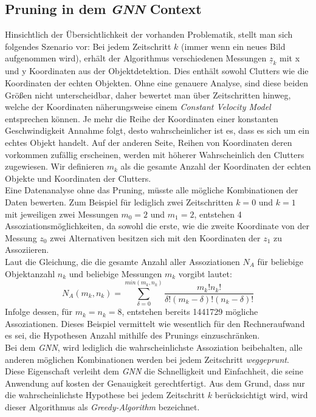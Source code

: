 \documentclass[10pt,a4paper]{article}
\begin{document}
\subsection{Pruning in dem \textit{GNN} Context}
Hinsichtlich der Übersichtlichkeit der vorhanden Problematik, stellt man sich folgendes Szenario vor: Bei jedem Zeitschritt $k$ (immer wenn ein neues Bild aufgenommen wird), erhält der Algorithmus verschiedenen Messungen $\underline{z}_k$ mit x und y Koordinaten aus der Objektdetektion. Dies enthält sowohl Clutters wie die Koordinaten der echten Objekten. Ohne eine genauere Analyse, sind diese beiden Größen nicht unterscheidbar, daher bewertet man über Zeitschritten hinweg, welche der Koordinaten näherungsweise einem \textit{Constant Velocity Model} entsprechen können. Je mehr die Reihe der Koordinaten einer konstanten Geschwindigkeit Annahme folgt, desto wahrscheinlicher ist es, dass es sich um ein echtes Objekt handelt. Auf der anderen Seite, Reihen von 
Koordinaten deren vorkommen zufällig erscheinen, werden mit höherer Wahrscheinlich den Clutters zugewiesen. Wir definieren $m_k$ als die gesamte Anzahl der Koordinaten der echten Objekte und Koordinaten der Clutters.\\
Eine Datenanalyse ohne das Pruning, müsste alle mögliche Kombinationen der Daten bewerten. Zum Beispiel für lediglich zwei Zeitschritten $k =0$ und $k=1$ mit jeweiligen zwei Messungen  $m_0 = 2$ und $m_1 = 2$, entstehen 4 Assoziationsmöglichkeiten, da sowohl die erste, wie die zweite Koordinate von der Messung $z_0$ zwei Alternativen besitzen sich mit den Koordinaten der $z_1$ zu Assoziieren.\\
Laut \cite{MOTyoutube} die Gleichung, die die gesamte Anzahl aller Assoziationen $N_A$ für beliebige Objektanzahl $n_k$ und beliebige Messungen $m_k$ vorgibt lautet:
\begin{equation}
N_A(m_k,n_k) = \sum_{\delta=0}^{min(m_k,n_k)}\dfrac{m_k!n_k!}{\delta!(m_k-\delta)!(n_k-\delta)!}
\end{equation}
Infolge dessen, für $m_k=n_k = 8$, entstehen bereits 1441729 mögliche Assoziationen. Dieses Beispiel vermittelt wie wesentlich für den Rechneraufwand es sei, die Hypothesen Anzahl mithilfe des Prunings einzuschränken. \\
Bei dem \textit{GNN}, wird lediglich die wahrscheinlichste Assoziation beibehalten, alle anderen möglichen Kombinationen werden bei jedem Zeitschritt \textit{weggeprunt}. Diese Eigenschaft verleiht dem \textit{GNN} die Schnelligkeit und Einfachheit, die seine Anwendung auf kosten der Genauigkeit gerechtfertigt. Aus dem Grund, dass nur die wahrscheinlichste Hypothese bei jedem Zeitschritt $k$ berücksichtigt wird, wird dieser Algorithmus als \textit{Greedy-Algorithm} bezeichnet. \\
\end{document}
